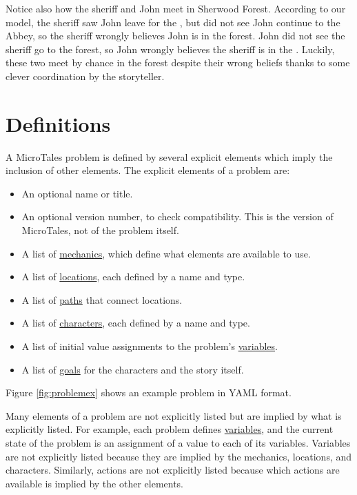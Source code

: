 \documentclass{nilreport}
\begin{document}
Notice also how the sheriff and John meet in Sherwood Forest. According to our model, the sheriff saw John leave for the , but did not see John continue to the Abbey, so the sheriff wrongly believes John is in the forest. John did not see the sheriff go to the forest, so John wrongly believes the sheriff is in the . Luckily, these two meet by chance in the forest despite their wrong beliefs thanks to some clever coordination by the storyteller.

\newpage

\section{Definitions}

A MicroTales problem is defined by several explicit elements which imply the inclusion of other elements. The explicit elements of a problem are:
\begin{itemize}
	\item An optional name or title.
	\item An optional version number, to check compatibility. This is the version of MicroTales, not of the problem itself.
	\item A list of \hyperref[sec:mechanics]{mechanics}, which define what elements are available to use.
	\item A list of \hyperref[sec:locations]{locations}, each defined by a name and type.
	\item A list of \hyperref[sec:locations]{paths} that connect locations.
	\item A list of \hyperref[sec:characters]{characters}, each defined by a name and type.
	\item A list of initial value assignments to the problem's \hyperref[sec:variables]{variables}.
	\item A list of \hyperref[sec:goals]{goals} for the characters and the story itself.
\end{itemize}

\noindent Figure \ref{fig:problemex} shows an example problem in YAML format.

Many elements of a problem are not explicitly listed but are implied by what is explicitly listed. For example, each problem defines \hyperref[sec:variables]{variables}, and the current state of the problem is an assignment of a value to each of its variables. Variables are not explicitly listed because they are implied by the mechanics, locations, and characters. Similarly, actions are not explicitly listed because which actions are available is implied by the other elements.
\end{document}
